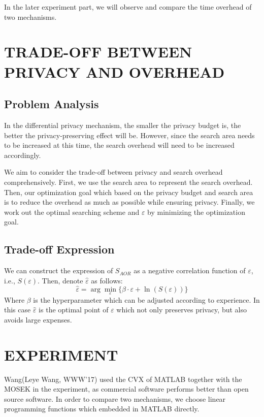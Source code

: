 In the later experiment part, we will observe and compare the time overhead of two mechanisms.

\section{TRADE-OFF BETWEEN PRIVACY AND OVERHEAD} %
\subsection{Problem Analysis} %
In the differential privacy mechanism, the smaller the privacy budget is, the better the privacy-preserving effect will be. However, since the search area needs to be increased at this time, the search overhead will need to be increased accordingly.

We aim to consider the trade-off between privacy and search overhead comprehensively. First, we use the search area to represent the search overhead. Then, our optimization goal which based on the privacy budget and search area is to reduce the overhead as much as possible while ensuring privacy. Finally, we work out the optimal searching scheme and $\varepsilon$ by minimizing the optimization goal.

\subsection{Trade-off Expression} %
We can construct the expression of $S_{AOR}$ as a negative correlation function of $\varepsilon$, i.e., $S(\varepsilon)$. Then, denote $\hat{\varepsilon}$ as follows:
$$
	\hat{\varepsilon}=\arg \min_\varepsilon \{ \beta \cdot \varepsilon + \ln (S(\varepsilon)) \}
$$
Where $\beta$ is the hyperparameter which can be adjusted according to experience. In this case $\hat{\varepsilon}$ is the optimal point of $\varepsilon$ which not only preserves privacy, but also avoids large expenses.

\section{EXPERIMENT} %
Wang(Leye Wang, WWW’17) used the CVX of MATLAB together with the MOSEK in the experiment, as commercial software performs better than open source software. In order to compare two mechanisms, we choose linear programming functions which embedded in MATLAB directly.

